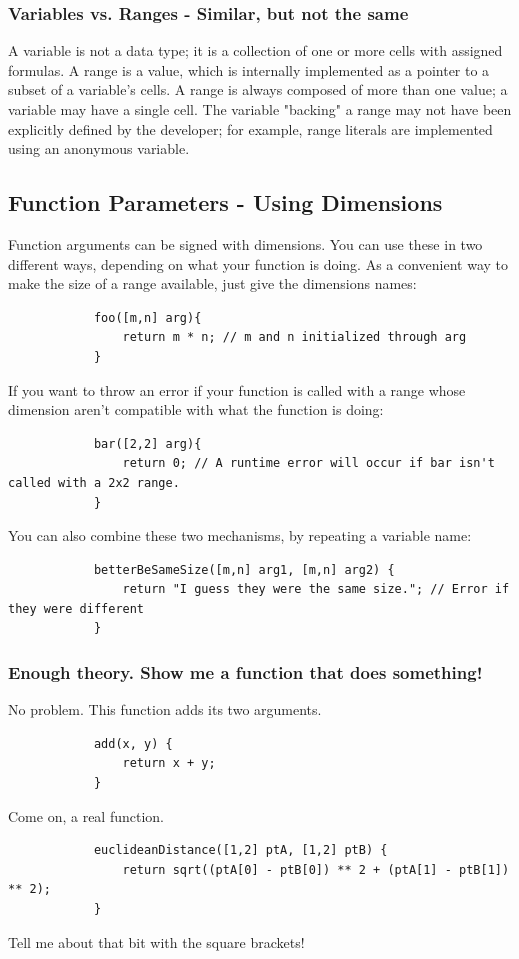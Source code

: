 		\subsubsection{Variables vs. Ranges - Similar, but not the same}
		A variable is not a data type; it is a collection of one or more cells with assigned formulas. A range is a value, which is internally implemented as a pointer to a subset of a variable's cells. A range is always composed of more than one value; a variable may have a single cell. The variable "backing" a range may not have been explicitly defined by the developer; for example, range literals are implemented using an anonymous variable.

	\subsection{Function Parameters - Using Dimensions}
		Function arguments can be signed with dimensions. You can use these in two different ways, depending on what your function is doing. As a convenient way to make the size of a range available, just give the dimensions names:

		\begin{lstlisting}
			foo([m,n] arg){
				return m * n; // m and n initialized through arg
			}
		\end{lstlisting}

		\medskip \noindent
		If you want to throw an error if your function is called with a range whose dimension aren't compatible with what the function is doing:

		\begin{lstlisting}
			bar([2,2] arg){
				return 0; // A runtime error will occur if bar isn't called with a 2x2 range.
			}
		\end{lstlisting}
		\medskip \noindent
		You can also combine these two mechanisms, by repeating a variable name:
		\begin{lstlisting}
			betterBeSameSize([m,n] arg1, [m,n] arg2) {
				return "I guess they were the same size."; // Error if they were different
			}
		\end{lstlisting}

		\subsubsection{Enough theory. Show me a function that does something!}
		No problem. This function adds its two arguments.
		\begin{lstlisting}
			add(x, y) {
				return x + y;
			}
		\end{lstlisting}
		\medskip \noindent
		Come on, a real function.
		\begin{lstlisting}
			euclideanDistance([1,2] ptA, [1,2] ptB) {
				return sqrt((ptA[0] - ptB[0]) ** 2 + (ptA[1] - ptB[1]) ** 2);
			}
		\end{lstlisting}
		\medskip \noindent
		Tell me about that bit with the square brackets!

